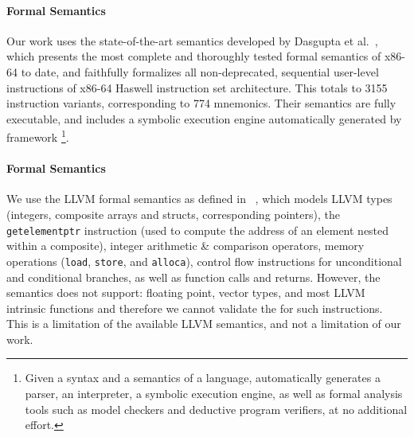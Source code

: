 \paragraph{\ISA Formal Semantics} Our work uses the state-of-the-art \ISA
semantics developed by Dasgupta et al.~\cite{DasguptaAdve:PLDI19}, which
presents the most complete and thoroughly tested formal semantics of x86-64 to
date, and faithfully formalizes all non-deprecated, sequential
user-level instructions of x86-64 Haswell instruction set architecture.
This totals to 3155 instruction variants, corresponding to 774 mnemonics.
Their semantics are fully executable, and includes a symbolic execution engine
automatically generated by \K framework
%
    \footnote{Given a syntax and a semantics of a language, \K automatically
    generates a parser, an interpreter, a symbolic execution engine, as well
    as formal analysis tools such as model checkers and deductive program
    verifiers, at no additional effort.}.
%

\paragraph{\LLVM Formal Semantics} We use the LLVM formal semantics as defined
in \K~\cite{LLVMSEMA}, which models LLVM types (integers, composite arrays and
structs, corresponding pointers), the \texttt{getelementptr} instruction (used
to compute the address of an element nested within a composite),  integer
arithmetic \& comparison operators, memory operations (\texttt{load},
\texttt{store}, and \texttt{alloca}), control flow instructions for
unconditional and conditional branches, as well as function calls and returns.
However, the semantics does not support: floating point, vector types, and
most LLVM intrinsic functions and therefore we cannot validate the \tv for
such instructions.  This is a limitation of the available LLVM semantics, and
not a limitation of our work.

